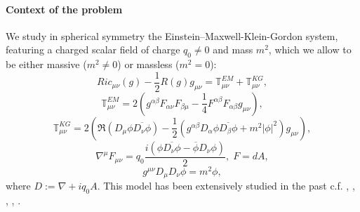 \documentclass[10pt,a4paper]{article}
\theoremstyle{plain}
\theoremstyle{remark}
\theoremstyle{definition}
\theoremstyle{plain}
\theoremstyle{remark}
\theoremstyle{definition}
\numberwithin{equation}{section}
\begin{document}
 	\paragraph{Context of the problem} We study in spherical symmetry the Einstein--Maxwell-Klein-Gordon system, featuring a charged scalar field of charge $q_0 \neq 0$ and mass $m^2$, which we allow to be either massive ($m^2 \neq 0$) or massless ($m^2 =0$):
 	\begin{equation} \label{1} Ric_{\mu \nu}(g)- \frac{1}{2}R(g)g_{\mu \nu}= \mathbb{T}^{EM}_{\mu \nu}+  \mathbb{T}^{KG}_{\mu \nu} ,    \end{equation} 
 	\begin{equation} \label{2} \mathbb{T}^{EM}_{\mu \nu}=2\left(g^{\alpha \beta}F _{\alpha \nu}F_{\beta \mu }-\frac{1}{4}F^{\alpha \beta}F_{\alpha \beta}g_{\mu \nu}\right),
 	\end{equation}
 	\begin{equation}\label{3}  \mathbb{T}^{KG}_{\mu \nu}= 2\left( \Re(D _{\mu}\phi \overline{D _{\nu}\phi}) -\frac{1}{2}(g^{\alpha \beta} D _{\alpha}\phi \overline{D _{\beta}\phi} + m ^{2}|\phi|^2  )g_{\mu \nu} \right), \end{equation} \begin{equation} \label{4}\nabla^{\mu} F_{\mu \nu}= q_{0}\frac{i (\phi \overline{D_{\nu}\phi} -\overline{\phi} D_{\nu}\phi) }{2} , \; F=dA ,
 	\end{equation} \begin{equation} \label{5} g^{\mu \nu} D_{\mu} D_{\nu}\phi = m ^{2} \phi,
 	\end{equation} where $D:=\nabla+iq_0 A$. This model has been extensively studied in the past c.f. \cite{extremeJonathan} \cite{HodPiran1}, \cite{HodPiran2}, \cite{Kommemi}, \cite{KonoplyaZhidenko}, \cite{OrenPiran}.
 	
\end{document}
